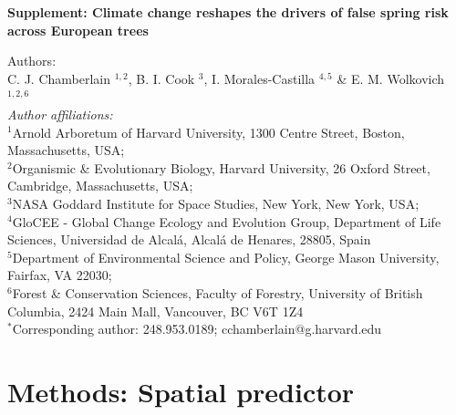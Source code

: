 \documentclass{article}\usepackage[]{graphicx}\usepackage[]{color}
\begin{document}
\noindent 
\textbf{\LARGE{Supplement: Climate change reshapes the drivers of false spring risk across European trees}} 



\noindent Authors:\\
C. J. Chamberlain $^{1,2}$, B. I. Cook $^{3}$, I. Morales-Castilla $^{4,5}$ \& E. M. Wolkovich $^{1,2,6}$
\vspace{2ex}\\
\emph{Author affiliations:}\\
$^{1}$Arnold Arboretum of Harvard University, 1300 Centre Street, Boston, Massachusetts, USA; \\
$^{2}$Organismic \& Evolutionary Biology, Harvard University, 26 Oxford Street, Cambridge, Massachusetts, USA; \\
$^{3}$NASA Goddard Institute for Space Studies, New York, New York, USA; \\
$^{4}$GloCEE - Global Change Ecology and Evolution Group, Department of Life Sciences, Universidad de Alcal\'{a}, Alcal\'{a} de Henares, 28805, Spain \\
$^{5}$Department of Environmental Science and Policy, George Mason University, Fairfax, VA 22030; \\
$^{6}$Forest \& Conservation Sciences, Faculty of Forestry, University of British Columbia, 2424 Main Mall, Vancouver, BC V6T 1Z4\\
\vspace{2ex}
$^*$Corresponding author: 248.953.0189; cchamberlain@g.harvard.edu\\

\renewcommand{\thetable}{S\arabic{table}}
\renewcommand{\thefigure}{S\arabic{figure}}
\renewcommand{\labelitemi}{$-$}

\section*{Methods: Spatial predictor} %
\end{document}
